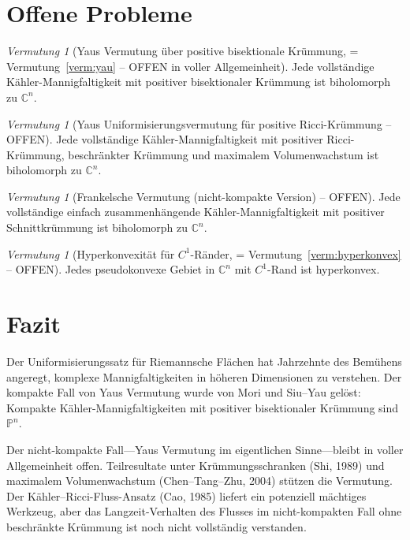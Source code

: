 \documentclass[12pt,a4paper]{amsart}
\theoremstyle{definition}
\theoremstyle{remark}
\newtheorem{vermutung}[theorem]{Vermutung}
\newcommand{\CC}{\mathbb{C}}
\newcommand{\PP}{\mathbb{P}}
\begin{document}
\section{Offene Probleme}

\begin{vermutung}[Yaus Vermutung über positive bisektionale Krümmung,
= Vermutung~\ref{verm:yau} -- OFFEN in voller Allgemeinheit]
Jede vollständige Kähler-Mannigfaltigkeit mit positiver bisektionaler
Krümmung ist biholomorph zu $\CC^n$.
\end{vermutung}

\begin{vermutung}[Yaus Uniformisierungsvermutung für positive Ricci-Krümmung -- OFFEN]
Jede vollständige Kähler-Mannigfaltigkeit mit positiver Ricci-Krümmung,
beschränkter Krümmung und maximalem Volumenwachstum ist biholomorph zu $\CC^n$.
\end{vermutung}

\begin{vermutung}[Frankelsche Vermutung (nicht-kompakte Version) -- OFFEN]
Jede vollständige einfach zusammenhängende Kähler-Mannigfaltigkeit mit
positiver Schnittkrümmung ist biholomorph zu $\CC^n$.
\end{vermutung}

\begin{vermutung}[Hyperkonvexität für $C^1$-Ränder,
= Vermutung~\ref{verm:hyperkonvex} -- OFFEN]
Jedes pseudokonvexe Gebiet in $\CC^n$ mit $C^1$-Rand ist hyperkonvex.
\end{vermutung}

\section{Fazit}

Der Uniformisierungssatz für Riemannsche Flächen hat Jahrzehnte des Bemühens
angeregt, komplexe Mannigfaltigkeiten in höheren Dimensionen zu verstehen.
Der kompakte Fall von Yaus Vermutung wurde von Mori und Siu--Yau gelöst:
Kompakte Kähler-Mannigfaltigkeiten mit positiver bisektionaler Krümmung
sind $\PP^n$.

Der nicht-kompakte Fall---Yaus Vermutung im eigentlichen Sinne---bleibt in
voller Allgemeinheit offen.  Teilresultate unter Krümmungsschranken (Shi, 1989)
und maximalem Volumenwachstum (Chen--Tang--Zhu, 2004) stützen die Vermutung.
Der Kähler--Ricci-Fluss-Ansatz (Cao, 1985) liefert ein potenziell mächtiges
Werkzeug, aber das Langzeit-Verhalten des Flusses im nicht-kompakten Fall
ohne beschränkte Krümmung ist noch nicht vollständig verstanden.
\end{document}

